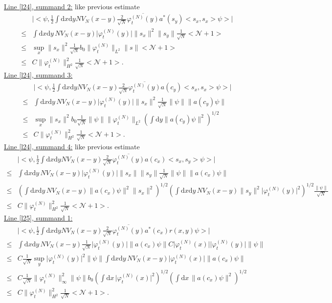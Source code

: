 \documentclass[11pt,a4paper]{scrartcl}
\newcommand{\di}{\textrm{d}}		%
\newcommand{\Ncal}{\mathcal{N}}		%
\newcommand{\estlist}[2]{\underline{Line \ref{l#1}, summand #2:}}
\newcommand{\scal}[2]{\big<#1,#2\big>} %
\newcommand{\cc}[1]{\overline{#1}}	%
\newcommand{\norm}[1]{\lVert#1\rVert}	%
\newcommand{\ev}[1]{\big<#1\big>}	%
\newcommand{\ph}{\varphi_t^{(N)}}	%
\newcommand{\dxyNV}{\frac{1}{2}\int \di x\di y N V_N(x-y)} %
\begin{document}
\estlist{24}{2} like previous estimate
\begin{align*}
& \lvert \scal{\psi}{\dxyNV \frac{2}{\sqrt{N}}\cc{\ph(y)} a^\ast(s_y) \scal{s_x}{s_x} \psi}\rvert \\
\leq &\int \di x\di y\, N V_N(x-y) \lvert \ph(y)\rvert \norm{s_x}^2 \norm{s_y} \frac{1}{\sqrt{N}}\ev{\Ncal+1} \\
\leq & \sup_x \norm{s_x}^2 \frac{1}{\sqrt{N}} b_0 \norm{\ph}_{L^2} \norm{s} \ev{\Ncal+1} \\
\leq & C\norm{\ph}_{H^2}^2 \frac{1}{\sqrt{N}}\ev{\Ncal+1}.
\end{align*}
\estlist{24}{3}
\begin{align*}
& \lvert \scal{\psi}{\dxyNV \frac{2}{\sqrt{N}}\cc{\ph(y)} a(c_y) \scal{s_x}{s_x} \psi}\rvert \\
\leq & \int \di x\di y\, NV_N(x-y) \lvert\ph(y)\rvert \norm{s_x}^2 \frac{1}{\sqrt{N}} \norm{\psi} \norm{a(c_y)\psi} \\
\leq & \sup_x \norm{s_x}^2 b_0 \frac{1}{\sqrt{N}} \norm{\psi} \norm{\ph}_{L^2} \left( \int \di y \norm{a(c_y)\psi}^2 \right)^{1/2}\\
\leq & C\norm{\ph}_{H^2}^2 \frac{1}{\sqrt{N}} \ev{\Ncal+1}.  
\end{align*}
\estlist{24}{4} like previous estimate
\begin{align*}
& \lvert \scal{\psi}{\dxyNV \frac{2}{\sqrt{N}} \cc{\ph(y)} a(c_x)\scal{s_x}{s_y}\psi} \rvert \\
\leq & \int \di x\di y\, NV_N(x-y) \lvert \ph(y)\rvert \norm{s_x} \norm{s_y} \frac{1}{\sqrt{N}} \norm{\psi} \norm{a(c_x)\psi} \\
\leq & \left( \int \di x\di y\, NV_N(x-y) \norm{a(c_x)\psi}^2 \norm{s_x}^2 \right)^{1/2} \left( \int \di x\di y\, N V_N(x-y) \norm{s_y}^2 \lvert \ph(y)\rvert^2 \right)^{1/2} \frac{\norm{\psi}}{\sqrt{N}} \\
\leq & C\norm{\ph}_{H^2}^2 \frac{1}{\sqrt{N}}\ev{\Ncal+1}. 
\end{align*}
\estlist{25}{1}
\begin{align*}
 & \lvert \scal{\psi}{\dxyNV \frac{2}{\sqrt{N}} \cc{\ph(y)} a^\ast(c_x) r(x,y) \psi} \rvert \\
\leq & \int \di x \di y\,N V_N(x-y) \frac{1}{\sqrt{N}} \lvert\ph(y)\rvert \norm{a(c_x)\psi} C\lvert\ph(x)\rvert\lvert\ph(y)\rvert \norm{\psi} \\
\leq & C \frac{1}{\sqrt{N}} \sup_y \lvert \ph(y)\rvert^2 \norm{\psi} \int \di x\di y\, NV_N(x-y) \lvert \ph(x)\rvert \norm{a(c_x)\psi} \\
\leq & C \frac{1}{\sqrt{N}} \norm{\ph}_\infty^2 \norm{\psi} b_0 \left( \int \di x\, \lvert \ph(x)\rvert^2 \right)^{1/2} \left( \int \di x\, \norm{a(c_x)\psi}^2 \right)^{1/2} \\
\leq & C \norm{\ph}_{H^2}^2 \frac{1}{\sqrt{N}}\ev{\Ncal+1}.
\end{align*}
\end{document}
